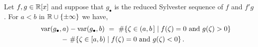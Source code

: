 \begin{theorem}[Sylvester]
  \label{Th:Sylvester}
  Let $f,g\in\mathbb{R}[x]$ and suppose that $g_\bullet$ is the reduced Sylvester sequence of $f$ and $f'g$.
  For $a<b$ in $\mathbb{R}\cup\{\pm\infty\}$ we have,
  \begin{multline*}
    \qquad\operatorname{{\rm var}}(g_\bullet,a)-\operatorname{{\rm var}}(g_\bullet,b)\ =\
    \#\{\zeta\in(a,b\hspace{.05cm}]\mid f(\zeta)=0\mbox{ and } g(\zeta)>0\}\\
      \ -\
    \#\{\zeta\in[a,b)\mid f(\zeta)=0\mbox{ and } g(\zeta)<0\}\,.\qquad
  \end{multline*}
\end{theorem}
